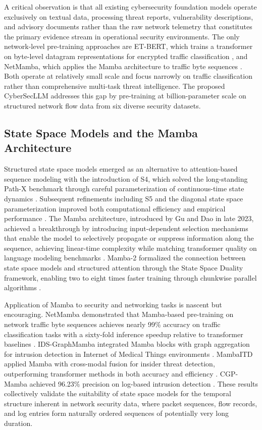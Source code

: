 \documentclass[journal]{IEEEtran}
\newcommand{\modelname}{CyberSecLLM}
\begin{document}
A critical observation is that all existing cybersecurity foundation models operate exclusively on textual data, processing threat reports, vulnerability descriptions, and advisory documents rather than the raw network telemetry that constitutes the primary evidence stream in operational security environments. The only network-level pre-training approaches are ET-BERT, which trains a transformer on byte-level datagram representations for encrypted traffic classification \cite{lin2022etbert}, and NetMamba, which applies the Mamba architecture to traffic byte sequences \cite{wang2024netmamba}. Both operate at relatively small scale and focus narrowly on traffic classification rather than comprehensive multi-task threat intelligence. The proposed \modelname{} addresses this gap by pre-training at billion-parameter scale on structured network flow data from six diverse security datasets.

\subsection{State Space Models and the Mamba Architecture}
\label{subsec:ssm_mamba}

Structured state space models emerged as an alternative to attention-based sequence modeling with the introduction of S4, which solved the long-standing Path-X benchmark through careful parameterization of continuous-time state dynamics \cite{gu2022s4}. Subsequent refinements including S5 and the diagonal state space parameterization improved both computational efficiency and empirical performance \cite{smith2023s5}. The Mamba architecture, introduced by Gu and Dao in late 2023, achieved a breakthrough by introducing input-dependent selection mechanisms that enable the model to selectively propagate or suppress information along the sequence, achieving linear-time complexity while matching transformer quality on language modeling benchmarks \cite{gu2024mamba}. Mamba-2 formalized the connection between state space models and structured attention through the State Space Duality framework, enabling two to eight times faster training through chunkwise parallel algorithms \cite{dao2024mamba2}.

Application of Mamba to security and networking tasks is nascent but encouraging. NetMamba demonstrated that Mamba-based pre-training on network traffic byte sequences achieves nearly 99\% accuracy on traffic classification tasks with a sixty-fold inference speedup relative to transformer baselines \cite{wang2024netmamba}. IDS-GraphMamba integrated Mamba blocks with graph aggregation for intrusion detection in Internet of Medical Things environments \cite{ids_graphmamba2025}. MambaITD applied Mamba with cross-modal fusion for insider threat detection, outperforming transformer methods in both accuracy and efficiency \cite{mambaitd2025}. CGP-Mamba achieved 96.23\% precision on log-based intrusion detection \cite{cgpmamba2025}. These results collectively validate the suitability of state space models for the temporal structure inherent in network security data, where packet sequences, flow records, and log entries form naturally ordered sequences of potentially very long duration.
\end{document}
